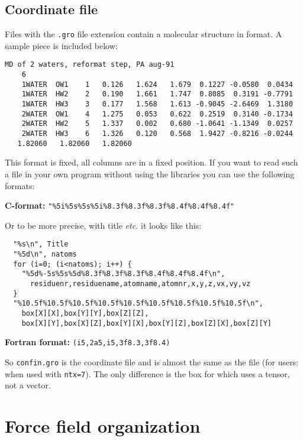 \subsection{Coordinate file}
\label{subsec:grofile}
Files with the {\tt .gro} file extension contain a molecular structure in 
 format. A sample piece is included below:

{\small
\begin{verbatim}
MD of 2 waters, reformat step, PA aug-91
    6
    1WATER  OW1    1   0.126   1.624   1.679  0.1227 -0.0580  0.0434
    1WATER  HW2    2   0.190   1.661   1.747  0.8085  0.3191 -0.7791
    1WATER  HW3    3   0.177   1.568   1.613 -0.9045 -2.6469  1.3180
    2WATER  OW1    4   1.275   0.053   0.622  0.2519  0.3140 -0.1734
    2WATER  HW2    5   1.337   0.002   0.680 -1.0641 -1.1349  0.0257
    2WATER  HW3    6   1.326   0.120   0.568  1.9427 -0.8216 -0.0244
   1.82060   1.82060   1.82060
\end{verbatim}}

This format is fixed, {\ie} all columns are in a fixed position. If you
want to read such a file in your own program without using the
{\gromacs} libraries you can use the following formats:

{\bf C-format:} {\tt "\%5i\%5s\%5s\%5i\%8.3f\%8.3f\%8.3f\%8.4f\%8.4f\%8.4f"}

Or to be more precise, with title {\em etc.} it looks like this:

\begin{verbatim}
  "%s\n", Title
  "%5d\n", natoms
  for (i=0; (i<natoms); i++) {
    "%5d%-5s%5s%5d%8.3f%8.3f%8.3f%8.4f%8.4f%8.4f\n",
      residuenr,residuename,atomname,atomnr,x,y,z,vx,vy,vz
  }
  "%10.5f%10.5f%10.5f%10.5f%10.5f%10.5f%10.5f%10.5f%10.5f\n",
    box[X][X],box[Y][Y],box[Z][Z],
    box[X][Y],box[X][Z],box[Y][X],box[Y][Z],box[Z][X],box[Z][Y]
\end{verbatim}

{\bf Fortran format:} {\tt (i5,2a5,i5,3f8.3,3f8.4)}

So {\tt confin.gro} is the {\gromacs} coordinate file and is almost
the same as the  file (for {\gromos} users: when used with
{\tt ntx=7}).  The only difference is the box for which {\gromacs} uses a
tensor, not a vector.



\section{Force field organization }
\label{sec:fforganization}

